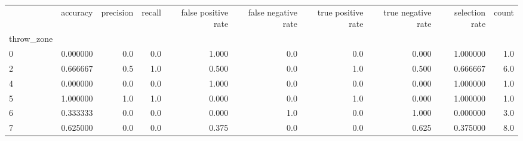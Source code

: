 \begin{tabular}{lrrrrrrrrr}
\toprule
{} &  accuracy &  precision &  recall &  false positive rate &  false negative rate &  true positive rate &  true negative rate &  selection rate &  count \\
throw\_zone &           &            &         &                      &                      &                     &                     &                 &        \\
\midrule
0          &  0.000000 &        0.0 &     0.0 &                1.000 &                  0.0 &                 0.0 &               0.000 &        1.000000 &    1.0 \\
2          &  0.666667 &        0.5 &     1.0 &                0.500 &                  0.0 &                 1.0 &               0.500 &        0.666667 &    6.0 \\
4          &  0.000000 &        0.0 &     0.0 &                1.000 &                  0.0 &                 0.0 &               0.000 &        1.000000 &    1.0 \\
5          &  1.000000 &        1.0 &     1.0 &                0.000 &                  0.0 &                 1.0 &               0.000 &        1.000000 &    1.0 \\
6          &  0.333333 &        0.0 &     0.0 &                0.000 &                  1.0 &                 0.0 &               1.000 &        0.000000 &    3.0 \\
7          &  0.625000 &        0.0 &     0.0 &                0.375 &                  0.0 &                 0.0 &               0.625 &        0.375000 &    8.0 \\
\bottomrule
\end{tabular}
